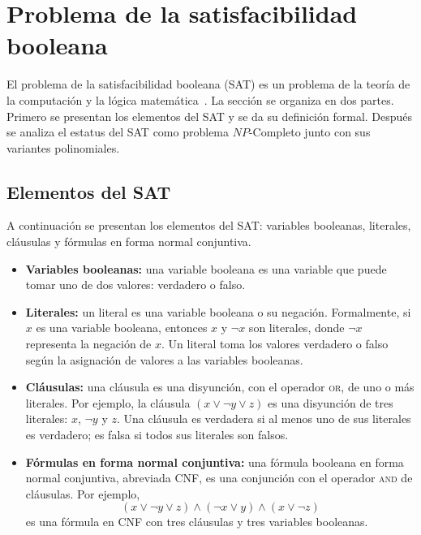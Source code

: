 \section{Problema de la satisfacibilidad booleana}
\label{sec:sat}

El problema de la satisfacibilidad booleana (SAT) es un problema de
la teoría de la computación y la lógica
matemática~\cite{hopcroft2006introduction}. La sección se organiza
en dos partes. Primero se presentan los elementos del SAT y se da
su definición formal. Después se analiza el estatus del SAT como
problema $NP$-Completo junto con sus variantes polinomiales.

\subsection{Elementos del SAT}
\label{sec:elementos-sat}

A continuación se presentan los elementos del SAT: variables
booleanas, literales, cláusulas y fórmulas en forma normal conjuntiva.

\begin{itemize}
  \item \textbf{Variables booleanas:} una variable booleana es una
    variable que puede tomar uno de dos valores: verdadero o
    falso.
  \item \textbf{Literales:} un literal es una variable booleana o su
    negación. Formalmente, si $x$ es una variable booleana, entonces
    $x$ y $\neg x$ son literales, donde $\neg x$ representa la
    negación de $x$. Un literal toma los valores verdadero o
    falso según la asignación de valores a las variables booleanas.
  \item \textbf{Cláusulas:} una cláusula es una disyunción, con el
    operador \textsc{or}, de uno o más literales. Por ejemplo, la cláusula
    $(x \vee \neg y \vee z)$ es una disyunción de tres literales: $x$,
    $\neg y$ y $z$. Una cláusula es verdadera si al menos uno de sus
    literales es verdadero; es falsa si todos sus literales son falsos.
  \item \textbf{Fórmulas en forma normal conjuntiva:} una fórmula
    booleana en forma normal conjuntiva, abreviada CNF, es una
    conjunción con el operador \textsc{and} de cláusulas. Por ejemplo,
    \[
      (x \vee \neg y \vee z) \wedge (\neg x \vee y) \wedge
      (x \vee \neg z)
    \]
    es una fórmula en CNF con tres cláusulas y tres variables booleanas.
\end{itemize}


